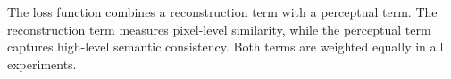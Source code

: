 The loss function combines a reconstruction term with a perceptual term. The reconstruction term measures pixel-level similarity, while the perceptual term captures high-level semantic consistency. Both terms are weighted equally in all experiments.
